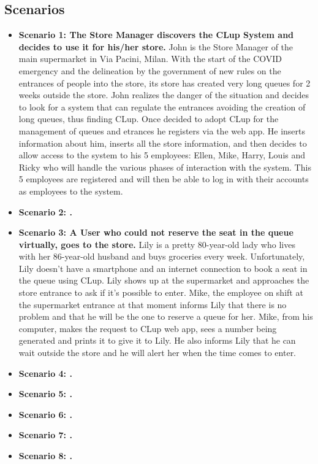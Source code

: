 \subsection{Scenarios}

\begin{itemize}
    \item \textbf{Scenario 1: The Store Manager discovers the CLup System and decides to use it for his/her store.} John is the Store Manager of the main supermarket in Via Pacini, Milan. With the start of the COVID emergency and the delineation by the government of new rules on the entrances of people into the store, its store has created very long queues for 2 weeks outside the store. John realizes the danger of the situation and decides to look for a system that can regulate the entrances avoiding the creation of long queues, thus finding CLup.
    Once decided to adopt CLup for the management of queues and etrances he registers via the web app. He inserts information about him, inserts all the store information, and then decides to allow access to the system to his 5 employees: Ellen, Mike, Harry, Louis and Ricky who will handle the various phases of interaction with the system. This 5 employees are registered and will then be able to log in with their accounts as employees to the system.
    \item \textbf{Scenario 2: .}
    \item \textbf{Scenario 3: A User who could not reserve the seat in the queue virtually, goes to the store.} Lily is a pretty 80-year-old lady who lives with her 86-year-old husband and buys groceries every week. Unfortunately, Lily doesn’t have a smartphone and an internet connection to book a seat in the queue using CLup. Lily shows up at the supermarket and approaches the store entrance to ask if it’s possible to enter. Mike, the employee on shift at the supermarket entrance at that moment informs Lily that there is no problem and that he will be the one to reserve a queue for her.
    Mike, from his computer, makes the request to CLup web app, sees a number being generated and prints it to give it to Lily. He also informs Lily that he can wait outside the store and he will alert her when the time comes to enter.
    \item \textbf{Scenario 4: .}
    \item \textbf{Scenario 5: .}
    \item \textbf{Scenario 6: .}
    \item \textbf{Scenario 7: .}
    \item \textbf{Scenario 8: .}
\end{itemize}

